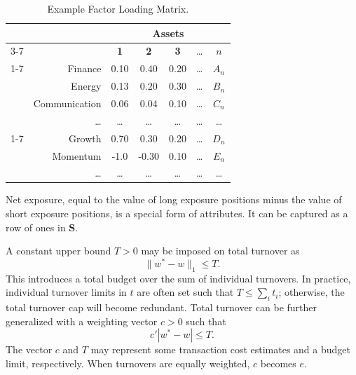 \documentclass[11pt, letterpaper]{article}
\begin{document}
\begin{table}[t]
\label{example_attribute_matrix}
\centering
    \caption{Example Factor Loading Matrix.}
    \vspace{0.3cm}
    \begin{tabular}{cr *{5}{c}}
        \toprule
        & & \multicolumn{5}{c}{\textbf{Assets}} \\
        \cmidrule(lr){3-7}
        & & \textbf{1} & \textbf{2} & \textbf{3} & \dots & \textbf{$n$} \\
        \cmidrule(lr){1-7}
        & Finance & 0.10 & 0.40 & 0.20 & \dots & $A_n$ \\
        & Energy & 0.13 & 0.20 & 0.30 & \dots & $B_n$ \\
        & Communication & 0.06 & 0.04 & 0.10 & \dots & $C_n$ \\
        & \dots & \dots & \dots & \dots & \dots & \dots \\
        \cmidrule(lr){1-7}
        & Growth & 0.70 & 0.30 & 0.20 & \dots & $D_n$ \\
        & Momentum & -1.0 & -0.30 & 0.10 & \dots & $E_n$ \\
        & \dots & \dots & \dots & \dots & \dots & \dots \\
        \bottomrule
    \end{tabular}
\end{table}

Net exposure, equal to the value of long exposure positions minus the value of short exposure positions, is a special form of
attributes. It can be captured as a row of ones in $\mathbf{S}$.

A constant upper bound $T > 0$ may be imposed on total turnover as
\begin{equation}
    \label{unedited_total_turnover}
	\lVert w^* - w\rVert_1 \leq T.
\end{equation}
This introduces a total budget over the sum of individual turnovers. In practice, individual turnover limits in $t$ are often
set such that $T \leq \sum_i t_i$; otherwise, the total turnover cap will become redundant. Total turnover can be further generalized
with a weighting vector $c > 0$ such that
\begin{equation*}
	c' |w^* - w| \leq T.
\end{equation*}
The vector $c$ and $T$ may represent some transaction cost estimates and a budget limit, respectively. When turnovers are equally weighted, $c$ becomes $e$.
\end{document}

